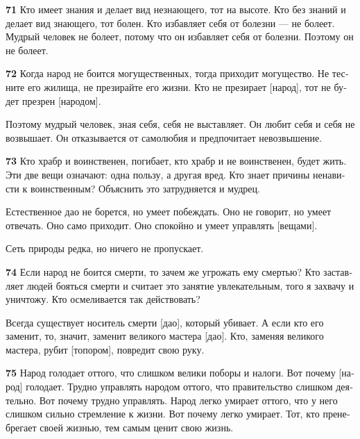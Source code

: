 \documentclass[a4paper]{article}
\begin{document}
{\ttfamily
\foreignlanguage{russian}{\textrm{\textbf{71}}}\foreignlanguage{russian}{\textrm{ Кто имеет знания и делает вид
незнающего, тот на высоте. Кто без знаний и делает вид знающего, тот болен. Кто избавляет себя от болезни — не болеет.
Мудрый человек не болеет, потому что он избавляет себя от болезни. Поэтому он не болеет.}}}

{\ttfamily
\foreignlanguage{russian}{\textrm{\textbf{72}}}\foreignlanguage{russian}{\textrm{ Когда народ не боится могущественных,
тогда приходит могущество. Не тесните его жилища, не презирайте его жизни. Кто не презирает [народ], тот не будет
презрен [народом].}}}

{
Поэтому мудрый человек, зная себя, себя не выставляет. Он любит себя и себя не возвышает. Он отказывается от самолюбия и
предпочитает невозвышение.}

{\ttfamily
\foreignlanguage{russian}{\textrm{\textbf{73}}}\foreignlanguage{russian}{\textrm{ Кто храбр и воинственен, погибает, кто
храбр и не воинственен, будет жить. Эти две вещи означают: одна пользу, а другая вред. Кто знает причины ненависти к
воинственным? Объяснить это затрудняется и мудрец.}}}

{
Естественное дао не борется, но умеет побеждать. Оно не говорит, но умеет отвечать. Оно само приходит. Оно спокойно и
умеет управлять [вещами].}

{
Сеть природы редка, но ничего не пропускает.}

{\ttfamily
\foreignlanguage{russian}{\textrm{\textbf{74}}}\foreignlanguage{russian}{\textrm{ Если народ не боится смерти, то зачем
же угрожать ему смертью? Кто заставляет людей бояться смерти и считает это занятие увлекательным, того я захвачу и
уничтожу. Кто осмеливается так действовать?}}}

{
Всегда существует носитель смерти [дао], который убивает. А если кто его заменит, то, значит, заменит великого мастера
[дао]. Кто, заменяя великого мастера, рубит [топором], повредит свою руку.}

{\ttfamily
\foreignlanguage{russian}{\textrm{\textbf{75}}}\foreignlanguage{russian}{\textrm{ Народ голодает оттого, что слишком
велики поборы и налоги. Вот почему [народ] голодает. Трудно управлять народом оттого, что правительство слишком
деятельно. Вот почему трудно управлять. Народ легко умирает оттого, что у него слишком сильно стремление к жизни. Вот
почему легко умирает. Тот, кто пренебрегает своей жизнью, тем самым ценит свою жизнь.}}}
\end{document}

